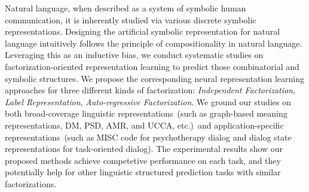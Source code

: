   Natural language, when described as a system of symbolic human
communication, it is inherently studied via various discrete symbolic
representations. Designing the artificial symbolic representation for
natural language intuitively follows the principle of compositionality
in natural language. Leveraging this as an inductive bias, we conduct
systematic studies on factorization-oriented representation learning
to predict those combinatorial and symbolic structures. We propose the
corresponding neural representation learning approaches for three
different kinds of factorization: {\it Independent Factorization},
{\it Label Representation}, {\it Auto-regressive Factorization}. We
ground our studies on both broad-coverage linguistic
representations~(such as graph-based meaning representations, DM, PSD,
AMR, and UCCA, etc.)~and application-specific representations~(such as
MISC code for psychotherapy dialog and dialog state representations
for task-oriented dialog). The experimental results show our proposed
methods achieve competetive performance on each task, and they
potentially help for other linguistic structured prediction tasks with
similar factorizations.

